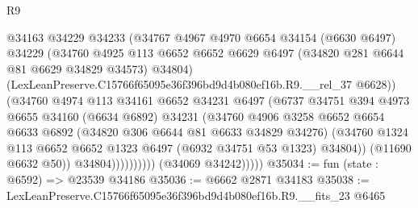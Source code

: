 \begin{lexlean}{R9}
\begin{coremodule}
                              @34163
                              @34229
                              @34233
                              (@34767
                                @4967
                                @4970
                                @6654
                                @34154
                                (@6630 @6497)
                                @34229
                                (@34760
                                  @4925
                                  @113
                                  @6652
                                  @6652
                                  @6629
                                  @6497
                                  (@34820 @281 @6644 @81 @6629 @34829 @34573)
                                  @34804)
                                (LexLeanPreserve.C15766f65095e36f396bd9d4b080ef16b.R9.__rel_37
                                  @6628))
                              (@34760
                                @4974
                                @113
                                @34161
                                @6652
                                @34231
                                @6497
                                (@6737
                                  @34751
                                  @394
                                  @4973
                                  @6655
                                  @34160
                                  (@6634 @6892)
                                  @34231
                                  (@34760
                                    @4906
                                    @3258
                                    @6652
                                    @6654
                                    @6633
                                    @6892
                                    (@34820 @306 @6644 @81 @6633 @34829 @34276)
                                    (@34760
                                      @1324
                                      @113
                                      @6652
                                      @6652
                                      @1323
                                      @6497
                                      (@6932 @34751 @53 @1323)
                                      @34804))
                                  (@11690 @6632 @50))
                                @34804))))))))))
            (@34069 @34242)))))
@35034 := fun (state : @6592) => @23539 @34186
@35036 := @6662 @2871 @34183
@35038 := LexLeanPreserve.C15766f65095e36f396bd9d4b080ef16b.R9.__fits_23 @6465

\end{coremodule}
\end{lexlean}
